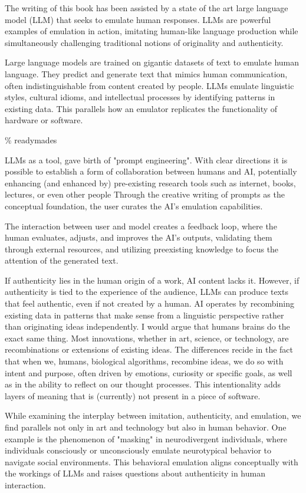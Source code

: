 The writing of this book has been assisted by a state of the art large language model (LLM) that seeks to emulate human responses. LLMs are powerful examples of emulation in action, imitating human-like language production while simultaneously challenging traditional notions of originality and authenticity. 

Large language models are trained on gigantic datasets of text to emulate human language. They predict and generate text that mimics human communication, often indistinguishable from content created by people. LLMs emulate linguistic styles, cultural idioms, and intellectual processes by identifying patterns in existing data. This parallels how an emulator replicates the functionality of hardware or software.

{\scriptsize \textcolor{comment}{\% readymades }}

LLMs as a tool, gave birth of "prompt engineering". With clear directions it is possible to establish a form of collaboration between humans and AI, potentially enhancing (and enhanced by) pre-existing research tools such as internet, books, lectures, or even other people Through the creative writing of prompts as the conceptual foundation, the user curates the AI's emulation capabilities.

The interaction between user and model creates a feedback loop, where the human evaluates, adjusts, and improves the AI's outputs, validating them through external resources, and utilizing preexisting knowledge to focus the attention of the generated text.

If authenticity lies in the human origin of a work, AI content lacks it. However, if authenticity is tied to the experience of the audience, LLMs can produce texts that feel authentic, even if not created by a human. AI operates by recombining existing data in patterns that make sense from a linguistic perspective rather than originating ideas independently. I would argue that humans brains do the exact same thing. Most innovations, whether in art, science, or technology, are recombinations or extensions of existing ideas. The differences recide in the fact that when we, humans, biological algorithms, recombine ideas, we do so with intent and purpose, often driven by emotions, curiosity or specific goals, as well as in the ability to reflect on our thought processes. This intentionality adds layers of meaning that is (currently) not present in a piece of software. 

While examining the interplay between imitation, authenticity, and emulation, we find parallels not only in art and technology but also in human behavior. One example is the phenomenon of "masking" in neurodivergent individuals, where individuals consciously or unconsciously emulate neurotypical behavior to navigate social environments. This behavioral emulation aligns conceptually with the workings of LLMs and raises questions about authenticity in human interaction. 

